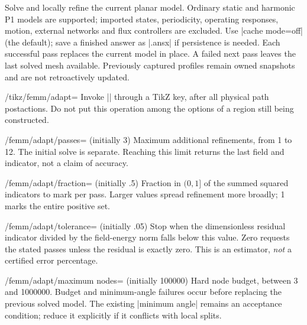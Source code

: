 \begin{command}{\femmadapt{}}
Solve and locally refine the current planar model. Ordinary static and harmonic
P1 models are supported; imported states, periodicity, operating responses,
motion, external networks and flux controllers are excluded. Use |cache mode=off|
(the default); save a finished answer as |.ansx| if persistence is needed.
Each successful pass replaces the current model in place. A failed next pass
leaves the last solved mesh available. Previously captured profiles remain owned
snapshots and are not retroactively updated.
\end{command}
\begin{key}{/tikz/femm/adapt=}
Invoke |\femmadapt| through a TikZ key, after all physical path postactions.
Do not put this operation among the options of a region still being constructed.
\end{key}
\begin{key}{/femm/adapt/passes= (initially 3)}
Maximum additional refinements, from 1 to 12. The initial solve is separate.
Reaching this limit returns the last field and indicator, not a claim of accuracy.
\end{key}
\begin{key}{/femm/adapt/fraction= (initially .5)}
Fraction in $(0,1]$ of the summed squared indicators to mark per pass.
Larger values spread refinement more broadly; 1 marks the entire positive set.
\end{key}
\begin{key}{/femm/adapt/tolerance= (initially .05)}
Stop when the dimensionless residual indicator divided by the field-energy norm
falls below this value. Zero requests the stated passes unless the residual is
exactly zero. This is an estimator, \emph{not} a certified error percentage.
\end{key}
\begin{key}{/femm/adapt/maximum nodes= (initially 100000)}
Hard node budget, between 3 and 1000000. Budget and minimum-angle failures occur
before replacing the previous solved model. The existing |minimum angle| remains
an acceptance condition; reduce it explicitly if it conflicts with local splits.
\end{key}

